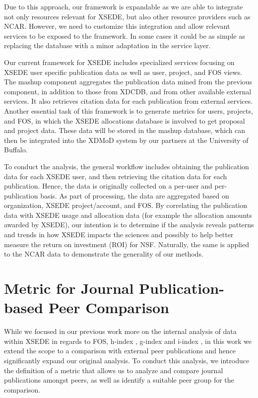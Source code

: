 \documentclass{sig-alternate}
\begin{document}
Due to this approach, our framework is expandable as we are able to integrate not only resources relevant for XSEDE, but also other resource providers such as NCAR. However, we need to customize this integration and allow relevant services to be exposed to the framework. In some cases it could be as simple as replacing the database with a minor adaptation in the service layer.



Our current framework for XSEDE includes specialized services focusing on XSEDE user specific publication data as well as user, project, and FOS views. The mashup component aggregates the publication data mined from the previous component, in addition to those from XDCDB, and from other available external services. It also retrieves citation data for each publication from external services. Another essential task of this framework is to generate metrics for users, projects, and FOS, in which the XSEDE allocations database is involved to get proposal and project data. These data will be stored in the mashup database, which can then be integrated into the XDMoD system \cite{Furlani:2013:UXF:2484762.2484763} by our partners at the University of Buffalo.

To conduct the analysis, the general workflow includes obtaining the publication data for each XSEDE user, and then retrieving the citation data for each publication. Hence, the data is originally collected on a per-user and per-publication basis. As part of processing, the data are aggregated based on organization, XSEDE project/account, and FOS.  By correlating the publication data with XSEDE usage and allocation data (for example the allocation amounts awarded by XSEDE), our intention is to determine if the analysis reveals patterns and trends in how XSEDE impacts the sciences and possibly to help better measure the return on investment (ROI) for NSF. Naturally, the same is applied to the NCAR data to demonstrate the generality of our methods.

\section{Metric for Journal Publication-based Peer Comparison} \label{S:metric}

While we focused in our previous work more on the internal analysis of data within XSEDE in regards to FOS, h-index \cite{hirsch2005index}, g-index \cite{www-i10index} and i-index \cite{egghe2006theory}, in this work we extend the scope to a comparison with external peer publications and hence significantly expand our original analysis. To conduct this analysis, we introduce the definition of a metric that allows us to analyze and compare journal publications amongst peers, as well as identify a suitable peer group for the comparison.
\end{document}
